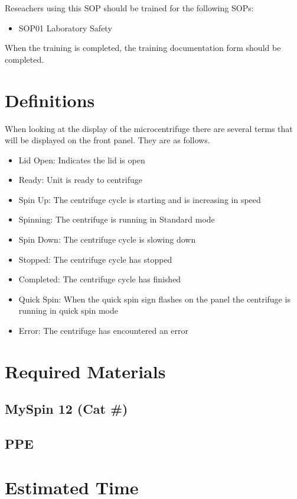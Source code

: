 \documentclass[12pt]{../SOP3_beta}
\begin{document}
\NP Reseachers using this SOP should be trained for the following SOPs:

\begin{itemize}
  \item SOP01 Laboratory Safety
\end{itemize}

When the training is completed, the training documentation form should be completed.


\section{Definitions}


\NP When looking at the display of the microcentrifuge there are several terms that will be displayed on the front panel. They are as follows.

\begin{itemize}
  \item Lid Open: Indicates the lid is open
  \item Ready: Unit is ready to centrifuge 
  \item Spin Up: The centrifuge cycle is starting and is increasing in speed
  \item Spinning: The centrifuge is running in Standard mode 
  \item Spin Down: The centrifuge cycle is slowing down
  \item Stopped: The centrifuge cycle has stopped
  \item Completed: The centrifuge cycle has finished
  \item Quick Spin: When the quick spin sign flashes on the panel the centrifuge is running in quick spin mode
  \item Error: The centrifuge has encountered an error
\end{itemize}

\section{Required Materials}

\subsection{MySpin 12 (Cat \#)}
\subsection{PPE}

\section{Estimated Time}
\end{document}
